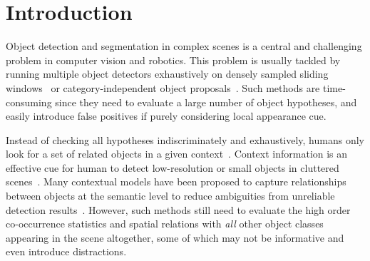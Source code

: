 \section{Introduction}

Object detection and segmentation in complex scenes is a central and challenging problem in computer vision and robotics.
This problem is usually tackled by running multiple object detectors exhaustively on densely sampled sliding windows~\cite{felzenszwalb2010object} or category-independent object proposals~\cite{carreira2012cpmc,van2011segmentation,arbelaez2014multiscale}. 
Such methods are time-consuming since they need to evaluate a large number of object hypotheses, and easily introduce false positives if purely considering local appearance cue.

Instead of checking all hypotheses indiscriminately and exhaustively, humans only look for a set of related objects in a given context~\cite{biederman1982scene, hock1974contextual}. Context information is an effective cue for human to detect low-resolution or small objects in cluttered scenes~\cite{parikh2012exploring}. Many contextual models have been proposed to capture relationships between objects at the semantic level to reduce ambiguities from unreliable detection results~\cite{gould2009decomposing, galleguillos2010context, ladicky2010graph}. %
However, such methods still need to evaluate the high order co-occurrence statistics and spatial relations with \emph{all} other object classes appearing in the scene altogether, some of which may not be informative and even introduce distractions.  

